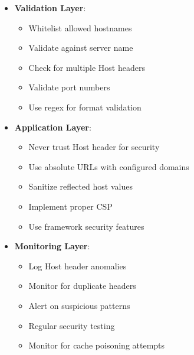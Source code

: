 \documentclass[12pt,a4paper]{article}
\begin{document}
\begin{itemize}
    \item \textbf{Validation Layer}:
        \begin{itemize}
            \item Whitelist allowed hostnames
            \item Validate against server name
            \item Check for multiple Host headers
            \item Validate port numbers
            \item Use regex for format validation
        \end{itemize}
    
    \item \textbf{Application Layer}:
        \begin{itemize}
            \item Never trust Host header for security
            \item Use absolute URLs with configured domains
            \item Sanitize reflected host values
            \item Implement proper CSP
            \item Use framework security features
        \end{itemize}
    
    
    \item \textbf{Monitoring Layer}:
        \begin{itemize}
            \item Log Host header anomalies
            \item Monitor for duplicate headers
            \item Alert on suspicious patterns
            \item Regular security testing
            \item Monitor for cache poisoning attempts
        \end{itemize}
\end{itemize}
\end{document}
